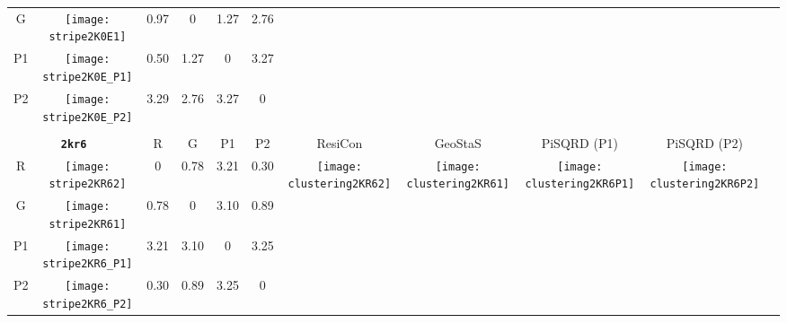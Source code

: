 \documentclass[a4paper,11pt,twoside]{book}%
\begin{document}
\begin{appendices}
\begin{sidewaystable}[h!]
\begin{tabular*}{4cm}{cc|c|c|c|c|c|c|c|c|c|}
\cline{1-6}
\multicolumn{1}{|c|}{G} & \texttt{[image: stripe2K0E1]} & 0.97 & 0 & 1.27 & 2.76 & \multirow{4}{*}{} & \multirow{4}{*}{} & \multirow{4}{*}{} & \multirow{4}{*}{} & \multirow{5}{*}{} \\
\cline{1-6}
\multicolumn{1}{|c|}{P1} & \texttt{[image: stripe2K0E\_P1]} & 0.50 & 1.27 & 0 & 3.27 & \multirow{4}{*}{} & \multirow{4}{*}{} & \multirow{4}{*}{} & \multirow{4}{*}{} & \multirow{5}{*}{}  \\
\cline{1-6}
\multicolumn{1}{|c|}{P2} & \texttt{[image: stripe2K0E\_P2]} & 3.29 & 2.76 & 3.27 & 0 & \multirow{4}{*}{} & \multirow{4}{*}{} & \multirow{4}{*}{} & \multirow{4}{*}{} & \multirow{5}{*}{}  \\
\cline{1-11}
\\
\cline{1-11}
\multicolumn{2}{|c|}{{\bf \texttt{2kr6}}} & R & G & P1 & P2 & ResiCon & GeoStaS & PiSQRD (P1) & PiSQRD (P2) & \multirow{5}{*}{\vspace{-0.15cm}\texttt{[image: threeHistogram2KR6]}}  \\
\cline{1-10}
\multicolumn{1}{|c|}{R} & \texttt{[image: stripe2KR62]} & 0 & 0.78 & 3.21 & 0.30 & \multirow{4}{*}{\vspace{-0.3cm}\texttt{[image: clustering2KR62]}} & \multirow{4}{*}{\vspace{-0.3cm}\texttt{[image: clustering2KR61]}} & \multirow{4}{*}{\vspace{-0.3cm}\texttt{[image: clustering2KR6P1]}} & \multirow{4}{*}{\vspace{-0.3cm}\texttt{[image: clustering2KR6P2]}} &  \multirow{5}{*}{} \\
\cline{1-6}
\multicolumn{1}{|c|}{G} & \texttt{[image: stripe2KR61]} & 0.78 & 0 & 3.10 & 0.89 & \multirow{4}{*}{} & \multirow{4}{*}{} & \multirow{4}{*}{} & \multirow{4}{*}{} & \multirow{5}{*}{} \\
\cline{1-6}
\multicolumn{1}{|c|}{P1} & \texttt{[image: stripe2KR6\_P1]} & 3.21 & 3.10 & 0 & 3.25 & \multirow{4}{*}{} & \multirow{4}{*}{} & \multirow{4}{*}{} & \multirow{4}{*}{} & \multirow{5}{*}{}  \\
\cline{1-6}
\multicolumn{1}{|c|}{P2} & \texttt{[image: stripe2KR6\_P2]} & 0.30 & 0.89 & 3.25 & 0 & \multirow{4}{*}{} & \multirow{4}{*}{} & \multirow{4}{*}{} & \multirow{4}{*}{} & \multirow{5}{*}{}  \\
\cline{1-11}
\end{tabular*}
\normalfont
\end{sidewaystable}





\end{appendices}
\end{document}
